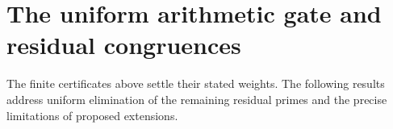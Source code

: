 \section{The uniform arithmetic gate and residual congruences}

The finite certificates above settle their stated weights.
The following results address uniform elimination of the remaining
residual primes and the precise limitations of proposed extensions.
